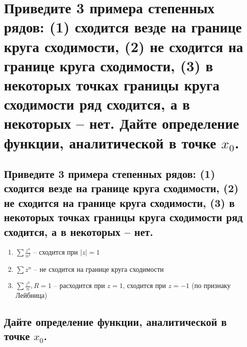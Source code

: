 \section{Приведите 3 примера степенных рядов: (1) сходится везде на границе круга сходимости, (2) не сходится на границе круга сходимости, (3) в некоторых точках границы круга сходимости ряд сходится, а в некоторых -- нет. Дайте определение функции, аналитической в точке $x_0$.}

\subsection{Приведите 3 примера степенных рядов: (1) сходится везде на границе круга сходимости, (2) не сходится на границе круга сходимости, (3) в некоторых точках границы круга сходимости ряд сходится, а в некоторых -- нет.}
\begin{enumerate}
    \item $\sum \frac{z^n}{n^2}$ -- сходится при $|z| = 1$
    \item $\sum z^n$ -- не сходится на границе круга сходимости 
    \item $\sum \frac{z^n}{n}, R = 1$ -- расходится при $z = 1$, сходится при $z = -1$ (по признаку Лейбница)
\end{enumerate}

\subsection{Дайте определение функции, аналитической в точке $x_0$.}